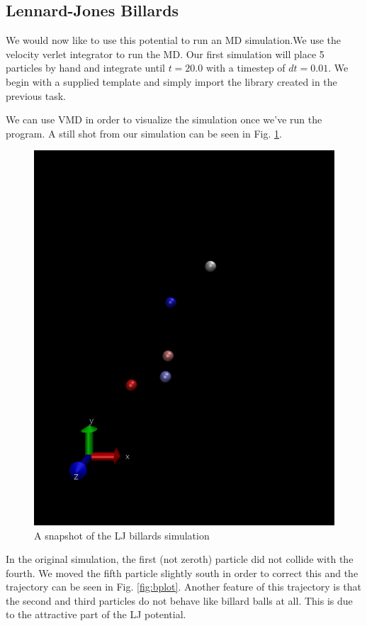 \documentclass[11pt,a4paper]{scrartcl}
\makeatletter
\newcommand{\listfile}[6]{
}
\makeatother
\begin{document}
\subsection{Lennard-Jones Billards}
We would now like to use this potential to run an MD simulation.We use the velocity verlet integrator to run the MD. Our first simulation will place 5 particles by hand and integrate until $t = 20.0$ with a timestep of $dt = 0.01$. We begin with a supplied template and simply import the library created in the previous task.  
\listfile{../src/ljbillards.py}{/src/ljbillards.py}{1}{3}{Import ljlib.py}{imports}
We can use VMD in order to visualize the simulation once we've run the program. A still shot from our simulation can be seen in Fig. \ref{fig:vmd}.
\begin{figure}[h]
\includegraphics[width=0.7\linewidth]{../fig/vmdscene.png}
  \centering
  \caption{A snapshot of the LJ billards simulation}
\label{fig:vmd}
\end{figure}
In the original simulation, the first (not zeroth) particle did not collide with the fourth. We moved the fifth particle slightly south in order to correct this and the trajectory can be seen in Fig. \ref{fig:bplot}. Another feature of this trajectory is that the second and third particles do not behave like billard balls at all. This is due to the attractive part of the LJ potential.
\end{document}
